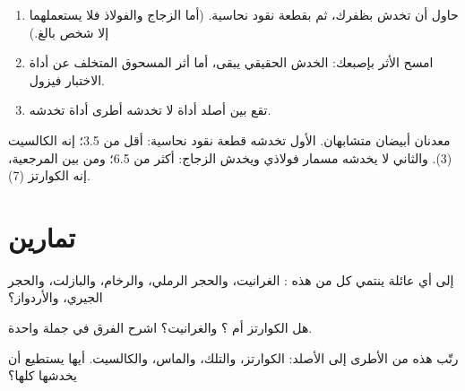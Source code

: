 \begin{method}\label{met:g6:rocks-and-minerals:scratch}
\begin{enumerate}
  \item حاول أن تخدش  بظفرك، ثم بقطعة نقود نحاسية. (أما الزجاج
        والفولاذ فلا يستعملهما إلا شخص بالغ.)
  \item امسح الأثر بإصبعك: الخدش الحقيقي يبقى، أما أثر المسحوق المتخلف
        عن أداة الاختبار فيزول.
  \item تقع  بين  أصلد أداة لا تخدشه  أطرى أداة
        تخدشه.
\end{enumerate}
\end{method}

\begin{example}\label{ex:g6:rocks-and-minerals:quartz-calcite}
معدنان أبيضان متشابهان. الأول تخدشه قطعة نقود نحاسية:  أقل من
3.5؛ إنه الكالسيت (3). والثاني لا يخدشه مسمار فولاذي ويخدش الزجاج:
 أكثر من 6.5؛ ومن بين  المرجعية، إنه
الكوارتز (7).
\end{example}

\section{تمارين}

\begin{exercise}[$\star$]\label{exo:g6:rocks-and-minerals:1}
إلى أي عائلة ينتمي كل  من هذه : الغرانيت، والحجر الرملي، والرخام،
والبازلت، والحجر الجيري، والأردواز؟
\end{exercise}

\begin{exercise}[$\star$]\label{exo:g6:rocks-and-minerals:2}
هل الكوارتز  أم ؟ والغرانيت؟ اشرح الفرق في
جملة واحدة.
\end{exercise}

\begin{exercise}[$\star$]\label{exo:g6:rocks-and-minerals:3}
رتّب هذه  من الأطرى إلى الأصلد: الكوارتز، والتلك، والماس،
والكالسيت. أيها يستطيع أن يخدشها كلها؟
\end{exercise}

